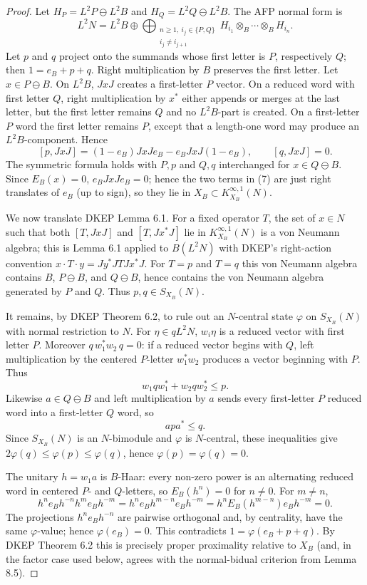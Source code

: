 \documentclass[12pt]{article}
\begin{document}
\begin{proof}
Let \(H_P=L^2P\ominus L^2B\) and \(H_Q=L^2Q\ominus L^2B\).  The AFP normal form is
\[
 L^2N=L^2B\oplus\!\!\bigoplus_{\substack{n\ge1,\ i_j\in\{P,Q\}\\
 i_j\ne i_{j+1}}}
 H_{i_1}\otimes_B\cdots\otimes_B H_{i_n}.
\]
Let \(p\) and \(q\) project onto the summands whose first letter is \(P\),
respectively \(Q\); then \(1=e_B+p+q\).  Right multiplication by \(B\) preserves
the first letter.  Let \(x\in P\ominus B\).  On \(L^2B\), \(JxJ\) creates a
first-letter \(P\) vector.  On a reduced word with first letter \(Q\), right
multiplication by \(x^*\) either appends or merges at the last letter, but the
first letter remains \(Q\) and no \(L^2B\)-part is created.  On a first-letter
\(P\) word the first letter remains \(P\), except that a length-one word may
produce an \(L^2B\)-component.  Hence
\[
 [p,JxJ]=(1-e_B)JxJe_B-e_BJxJ(1-e_B),\qquad [q,JxJ]=0.             \tag{7}
\]
The symmetric formula holds with \(P,p\) and \(Q,q\) interchanged for
\(x\in Q\ominus B\).  Since \(E_B(x)=0\), \(e_BJxJe_B=0\); hence the two terms
in (7) are just right translates of \(e_B\) (up to sign), so they lie in
\(X_B\subset K_{X_B}^{\infty,1}(N)\).

We now translate DKEP Lemma 6.1.  For a fixed operator \(T\), the set of
\(x\in N\) such that both \([T,JxJ]\) and \([T,Jx^*J]\) lie in
\(K_{X_B}^{\infty,1}(N)\) is a von Neumann algebra; this is Lemma 6.1 applied
to \(B(L^2N)\) with DKEP's right-action convention
\(x\cdot T\cdot y=Jy^*JTJx^*J\).  For \(T=p\) and \(T=q\) this von Neumann
algebra contains \(B\), \(P\ominus B\), and \(Q\ominus B\), hence contains the
von Neumann algebra generated by \(P\) and \(Q\).  Thus \(p,q\in S_{X_B}(N)\).

It remains, by DKEP Theorem 6.2, to rule out an \(N\)-central state
\(\varphi\) on \(S_{X_B}(N)\) with normal restriction to \(N\).  For
\(\eta\in qL^2N\), \(w_i\eta\) is a reduced vector with first letter \(P\).
Moreover \(q\,w_1^*w_2\,q=0\): if a reduced vector begins with \(Q\), left
multiplication by the centered \(P\)-letter \(w_1^*w_2\) produces a vector
beginning with \(P\).  Thus
\[
        w_1qw_1^*+w_2qw_2^*\le p .
\]
Likewise \(a\in Q\ominus B\) and left multiplication by \(a\) sends every
first-letter \(P\) reduced word into a first-letter \(Q\) word, so
\[
        a p a^*\le q .
\]
Since \(S_{X_B}(N)\) is an \(N\)-bimodule and \(\varphi\) is \(N\)-central,
these inequalities give \(2\varphi(q)\le\varphi(p)\le\varphi(q)\), hence
\(\varphi(p)=\varphi(q)=0\).

The unitary \(h=w_1a\) is \(B\)-Haar: every non-zero power is an alternating
reduced word in centered \(P\)- and \(Q\)-letters, so \(E_B(h^n)=0\) for
\(n\ne0\).  For \(m\ne n\),
\[
h^ne_Bh^{-n}h^me_Bh^{-m}
 =h^n e_B h^{m-n}e_Bh^{-m}=h^nE_B(h^{m-n})e_Bh^{-m}=0 .
\]
The projections \(h^ne_Bh^{-n}\) are pairwise orthogonal and, by centrality,
have the same \(\varphi\)-value; hence \(\varphi(e_B)=0\).  This contradicts
\(1=\varphi(e_B+p+q)\).  By DKEP Theorem 6.2 this is precisely proper
proximality relative to \(X_B\) (and, in the factor case used below, agrees
with the normal-bidual criterion from Lemma 8.5).
\end{proof}
\end{document}
